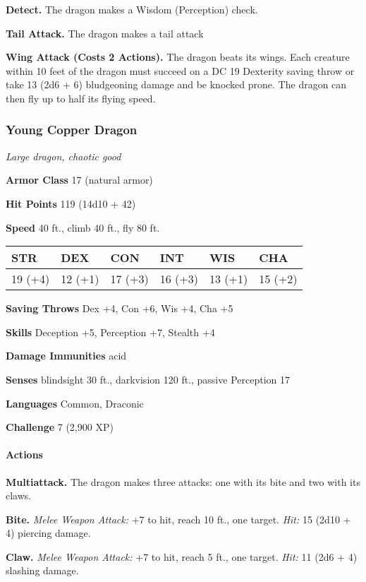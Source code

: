\documentclass[
]{article}
\begin{document}
\textbf{Detect.} The dragon makes a Wisdom (Perception) check.

\textbf{Tail Attack.} The dragon makes a tail attack

\textbf{Wing Attack (Costs 2 Actions).} The dragon beats its wings. Each
creature within 10 feet of the dragon must succeed on a DC 19 Dexterity
saving throw or take 13 (2d6 + 6) bludgeoning damage and be knocked
prone. The dragon can then fly up to half its flying speed.

\hypertarget{young-copper-dragon}{%
\subsubsection{Young Copper Dragon}\label{young-copper-dragon}}

\emph{Large dragon, chaotic good}

\textbf{Armor Class} 17 (natural armor)

\textbf{Hit Points} 119 (14d10 + 42)

\textbf{Speed} 40 ft., climb 40 ft., fly 80 ft.

\begin{longtable}[]{@{}llllll@{}}
\toprule
STR & DEX & CON & INT & WIS & CHA\tabularnewline
\midrule
\endhead
19 (+4) & 12 (+1) & 17 (+3) & 16 (+3) & 13 (+1) & 15 (+2)\tabularnewline
\bottomrule
\end{longtable}

\textbf{Saving Throws} Dex +4, Con +6, Wis +4, Cha +5

\textbf{Skills} Deception +5, Perception +7, Stealth +4

\textbf{Damage Immunities} acid

\textbf{Senses} blindsight 30 ft., darkvision 120 ft., passive
Perception 17

\textbf{Languages} Common, Draconic

\textbf{Challenge} 7 (2,900 XP)

\hypertarget{actions-53}{%
\paragraph{Actions}\label{actions-53}}

\textbf{Multiattack.} The dragon makes three attacks: one with its bite
and two with its claws.

\textbf{Bite.} \emph{Melee Weapon Attack:} +7 to hit, reach 10 ft., one
target. \emph{Hit:} 15 (2d10 + 4) piercing damage.

\textbf{Claw.} \emph{Melee Weapon Attack:} +7 to hit, reach 5 ft., one
target. \emph{Hit:} 11 (2d6 + 4) slashing damage.
\end{document}
